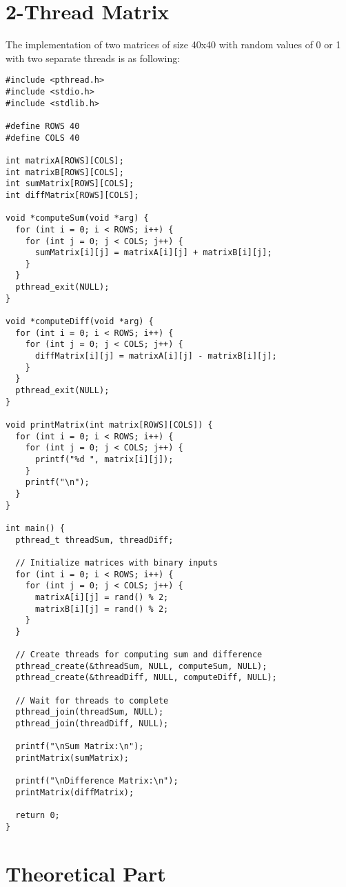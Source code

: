 \documentclass{article}
\begin{document}
\section{2-Thread Matrix}%
The implementation of two matrices of size 40x40 with random values of 0 or 1 with two separate threads is as
following:
\begin{lstlisting}[style=cstyle]
#include <pthread.h>
#include <stdio.h>
#include <stdlib.h>

#define ROWS 40
#define COLS 40

int matrixA[ROWS][COLS];
int matrixB[ROWS][COLS];
int sumMatrix[ROWS][COLS];
int diffMatrix[ROWS][COLS];

void *computeSum(void *arg) {
  for (int i = 0; i < ROWS; i++) {
    for (int j = 0; j < COLS; j++) {
      sumMatrix[i][j] = matrixA[i][j] + matrixB[i][j];
    }
  }
  pthread_exit(NULL);
}

void *computeDiff(void *arg) {
  for (int i = 0; i < ROWS; i++) {
    for (int j = 0; j < COLS; j++) {
      diffMatrix[i][j] = matrixA[i][j] - matrixB[i][j];
    }
  }
  pthread_exit(NULL);
}

void printMatrix(int matrix[ROWS][COLS]) {
  for (int i = 0; i < ROWS; i++) {
    for (int j = 0; j < COLS; j++) {
      printf("%d ", matrix[i][j]);
    }
    printf("\n");
  }
}

int main() {
  pthread_t threadSum, threadDiff;

  // Initialize matrices with binary inputs
  for (int i = 0; i < ROWS; i++) {
    for (int j = 0; j < COLS; j++) {
      matrixA[i][j] = rand() % 2;
      matrixB[i][j] = rand() % 2;
    }
  }

  // Create threads for computing sum and difference
  pthread_create(&threadSum, NULL, computeSum, NULL);
  pthread_create(&threadDiff, NULL, computeDiff, NULL);

  // Wait for threads to complete
  pthread_join(threadSum, NULL);
  pthread_join(threadDiff, NULL);

  printf("\nSum Matrix:\n");
  printMatrix(sumMatrix);

  printf("\nDifference Matrix:\n");
  printMatrix(diffMatrix);

  return 0;
}
\end{lstlisting}

\pagebreak

\section*{Theoretical Part}%
\setcounter{section}{0}
\end{document}
